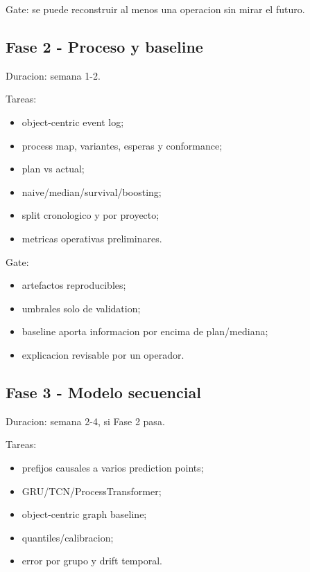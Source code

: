 \documentclass[
  spanish,
  10pt,
  a4paper,
]{article}
\providecommand{\tightlist}{%
  \setlength{\itemsep}{0pt}\setlength{\parskip}{0pt}}
\begin{document}
Gate: se puede reconstruir al menos una operacion sin mirar el futuro.

\subsection{Fase 2 - Proceso y
baseline}\label{fase-2---proceso-y-baseline}

Duracion: semana 1-2.

Tareas:

\begin{itemize}
\tightlist
\item
  object-centric event log;
\item
  process map, variantes, esperas y conformance;
\item
  plan vs actual;
\item
  naive/median/survival/boosting;
\item
  split cronologico y por proyecto;
\item
  metricas operativas preliminares.
\end{itemize}

Gate:

\begin{itemize}
\tightlist
\item
  artefactos reproducibles;
\item
  umbrales solo de validation;
\item
  baseline aporta informacion por encima de plan/mediana;
\item
  explicacion revisable por un operador.
\end{itemize}

\subsection{Fase 3 - Modelo
secuencial}\label{fase-3---modelo-secuencial}

Duracion: semana 2-4, si Fase 2 pasa.

Tareas:

\begin{itemize}
\tightlist
\item
  prefijos causales a varios prediction points;
\item
  GRU/TCN/ProcessTransformer;
\item
  object-centric graph baseline;
\item
  quantiles/calibracion;
\item
  error por grupo y drift temporal.
\end{itemize}
\end{document}
